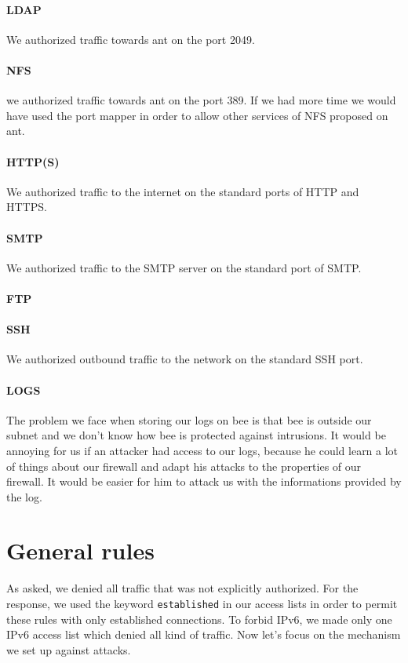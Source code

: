 \documentclass[a4paper,titlepage]{article}
\begin{document}
\paragraph{LDAP} We authorized traffic towards ant on the port 2049.
\paragraph{NFS} we authorized traffic towards ant on the port 389. If we had more time we would have used the port mapper in order to allow other services of NFS proposed on ant.
\paragraph{HTTP(S)} We authorized traffic to the internet on the standard ports of HTTP and HTTPS.
\paragraph{SMTP} We authorized traffic to the SMTP server on the standard port of SMTP.
\paragraph{FTP} 
\paragraph{SSH} We authorized outbound traffic to the network on the standard SSH port.
\paragraph{LOGS} The problem we face when storing our logs on bee is that bee is outside our subnet and we don't know how bee is protected against intrusions. It would be annoying for us if an attacker had access to our logs, because he could learn a lot of things about our firewall and adapt his attacks to the properties of our firewall. It would be easier for him to attack us with the informations provided by the log. 

\section{General rules}
As asked, we denied all traffic that was not explicitly authorized. For the response, we used the keyword \texttt{established} in our access lists in order to permit these rules with only established connections. To forbid IPv6, we made only one IPv6 access list which denied all kind of traffic. Now let's focus on the mechanism we set up against attacks.
\end{document}

